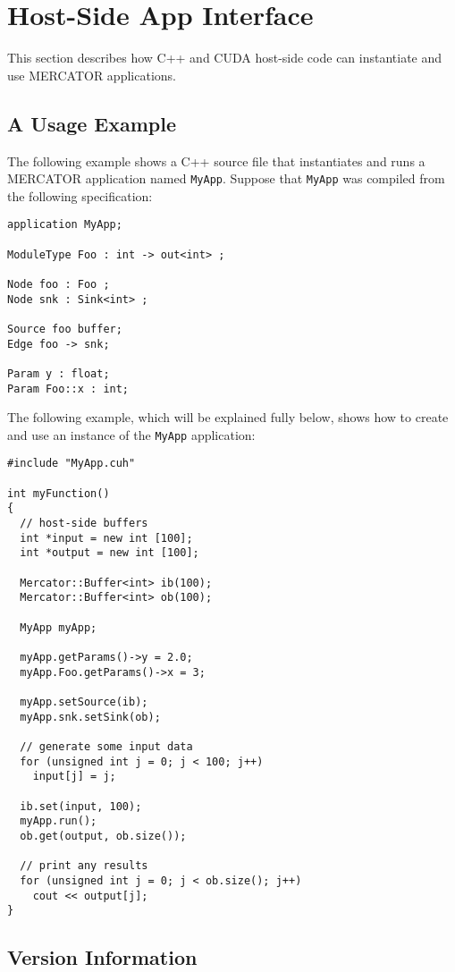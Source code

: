 \documentclass[11pt]{article}
\begin{document}
\newpage

\section{Host-Side App Interface}

This section describes how C++ and CUDA host-side code can instantiate
and use MERCATOR applications.  

\subsection{A Usage Example}

The following example shows a C++ source file that instantiates and runs
a MERCATOR application named \texttt{MyApp}.  Suppose that \texttt{MyApp}
was compiled from the following specification:
\begin{verbatim}
application MyApp;

ModuleType Foo : int -> out<int> ;

Node foo : Foo ;
Node snk : Sink<int> ;

Source foo buffer;
Edge foo -> snk;

Param y : float;
Param Foo::x : int;

\end{verbatim}
The following example, which will be explained fully below, shows how
to create and use an instance of the \texttt{MyApp} application:
\begin{verbatim}
#include "MyApp.cuh"

int myFunction()
{
  // host-side buffers
  int *input = new int [100];  
  int *output = new int [100];  

  Mercator::Buffer<int> ib(100);
  Mercator::Buffer<int> ob(100);

  MyApp myApp;

  myApp.getParams()->y = 2.0;
  myApp.Foo.getParams()->x = 3;

  myApp.setSource(ib);
  myApp.snk.setSink(ob);

  // generate some input data
  for (unsigned int j = 0; j < 100; j++)
    input[j] = j;

  ib.set(input, 100);
  myApp.run();
  ob.get(output, ob.size());

  // print any results
  for (unsigned int j = 0; j < ob.size(); j++)
    cout << output[j];
}
\end{verbatim}

\subsection{Version Information}
\end{document}
